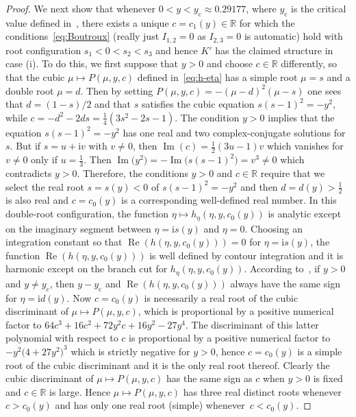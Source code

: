 \documentclass[pdftex]{sigma}
\numberwithin{equation}{section}
\begin{document}
\begin{proof}
We next show that whenever $0<y<y_\mathrm{c}\approx 0.29177$, where $y_\mathrm{c}$ is the critical value defined in~\cite[Section 4.6]{BuckinghamM22}, there exists a unique $c=c_1(y)\in\mathbb{R}$ for which the conditions~\eqref{eq:Boutroux} (really just $I_{1,2}=0$ as $I_{2,3}=0$ is automatic) hold with root configuration $s_1<0<s_2<s_3$ and hence $K'$ has the claimed structure in case (i). To do this, we first suppose that $y>0$ and choose $c\in\mathbb{R}$ differently, so that the cubic $\mu\mapsto P(\mu,y,c)$ defined in~\eqref{eq:h-eta} has a simple root $\mu=s$ and a double root $\mu=d$.
Then by setting $P(\mu,y,c)=-(\mu-d)^2(\mu-s)$ one sees that $d=(1-s)/2$ and that $s$ satisfies the cubic equation $s(s-1)^2=-y^2$, while $c=-d^2-2ds=\frac{1}{4}(3s^2-2s-1)$. The condition $y>0$ implies that the equation $s(s-1)^2=-y^2$ has one real and two complex-conjugate solutions for $s$. But if $s=u+\mathrm{i} v$ with $v\neq 0$, then $\operatorname{Im}(c)=\frac{1}{2}(3u-1)v$ which vanishes for $v\neq 0$ only if $u=\frac{1}{3}$. Then $\operatorname{Im}\bigl(y^2\bigr)=-\operatorname{Im}\bigl(s(s-1)^2\bigr)=v^3\neq 0$ which contradicts $y>0$. Therefore, the conditions $y>0$ and $c\in\mathbb{R}$ require that we select the real root $s=s(y)<0$ of $s(s-1)^2=-y^2$ and then $d=d(y)>\frac{1}{2}$ is also real and $c=c_0(y)$ is a corresponding well-defined real number. In this double-root configuration, the function $\eta\mapsto h_\eta(\eta,y,c_0(y))$ is analytic except on the imaginary segment between $\eta=\mathrm{i} s(y)$ and $\eta=0$. Choosing an integration constant so that $\operatorname{Re}(h(\eta,y,c_0(y)))=0$ for $\eta=\mathrm{i} s(y)$, the function $\operatorname{Re}(h(\eta,y,c_0(y)))$ is well defined by contour integration and it is harmonic except on the branch cut for $h_\eta(\eta,y,c_0(y))$. According to~\cite[Section 4.6]{BuckinghamM22}, if $y>0$ and $y\neq y_\mathrm{c}$, then $y-y_\mathrm{c}$ and $\operatorname{Re}(h(\eta,y,c_0(y)))$ always have the same sign for $\eta=\mathrm{i} d(y)$. Now $c=c_0(y)$ is necessarily a real root of the cubic discriminant of $\mu\mapsto P(\mu,y,c)$, which is proportional by a positive numerical factor to $64 c^3+16c^2+72y^2c + 16y^2-27y^4$. The discriminant of this latter polynomial with respect to $c$ is proportional by a positive numerical factor to $-y^2\bigl(4+27y^2\bigr)^3$ which is strictly negative for $y>0$, hence $c=c_0(y)$ is a simple root of the cubic discriminant and it is the only real root thereof. Clearly the cubic discriminant of $\mu\mapsto P(\mu,y,c)$ has the same sign as $c$ when $y>0$ is fixed and $c\in\mathbb{R}$ is large. Hence $\mu\mapsto P(\mu,y,c)$ has three real distinct roots whenever $c>c_0(y)$ and has only one real root (simple) whenever~${c<c_0(y)}$.


\end{proof}
\end{document}
